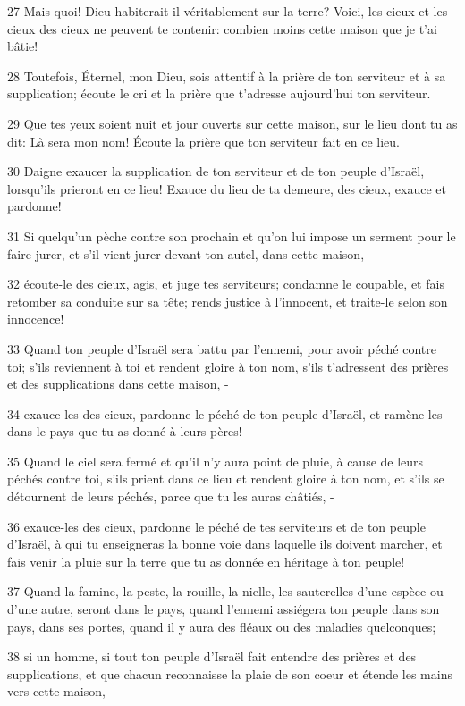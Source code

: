 \par 27 Mais quoi! Dieu habiterait-il véritablement sur la terre? Voici, les cieux et les cieux des cieux ne peuvent te contenir: combien moins cette maison que je t'ai bâtie!
\par 28 Toutefois, Éternel, mon Dieu, sois attentif à la prière de ton serviteur et à sa supplication; écoute le cri et la prière que t'adresse aujourd'hui ton serviteur.
\par 29 Que tes yeux soient nuit et jour ouverts sur cette maison, sur le lieu dont tu as dit: Là sera mon nom! Écoute la prière que ton serviteur fait en ce lieu.
\par 30 Daigne exaucer la supplication de ton serviteur et de ton peuple d'Israël, lorsqu'ils prieront en ce lieu! Exauce du lieu de ta demeure, des cieux, exauce et pardonne!
\par 31 Si quelqu'un pèche contre son prochain et qu'on lui impose un serment pour le faire jurer, et s'il vient jurer devant ton autel, dans cette maison, -
\par 32 écoute-le des cieux, agis, et juge tes serviteurs; condamne le coupable, et fais retomber sa conduite sur sa tête; rends justice à l'innocent, et traite-le selon son innocence!
\par 33 Quand ton peuple d'Israël sera battu par l'ennemi, pour avoir péché contre toi; s'ils reviennent à toi et rendent gloire à ton nom, s'ils t'adressent des prières et des supplications dans cette maison, -
\par 34 exauce-les des cieux, pardonne le péché de ton peuple d'Israël, et ramène-les dans le pays que tu as donné à leurs pères!
\par 35 Quand le ciel sera fermé et qu'il n'y aura point de pluie, à cause de leurs péchés contre toi, s'ils prient dans ce lieu et rendent gloire à ton nom, et s'ils se détournent de leurs péchés, parce que tu les auras châtiés, -
\par 36 exauce-les des cieux, pardonne le péché de tes serviteurs et de ton peuple d'Israël, à qui tu enseigneras la bonne voie dans laquelle ils doivent marcher, et fais venir la pluie sur la terre que tu as donnée en héritage à ton peuple!
\par 37 Quand la famine, la peste, la rouille, la nielle, les sauterelles d'une espèce ou d'une autre, seront dans le pays, quand l'ennemi assiégera ton peuple dans son pays, dans ses portes, quand il y aura des fléaux ou des maladies quelconques;
\par 38 si un homme, si tout ton peuple d'Israël fait entendre des prières et des supplications, et que chacun reconnaisse la plaie de son coeur et étende les mains vers cette maison, -

